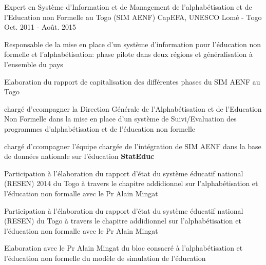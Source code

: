 \begin{cventries}
  \cventry
    {Expert en Système d'Information et de Management de l'alphabétisation et de l'Education non Formelle au Togo (SIM AENF)} %
    {CapEFA, UNESCO} %
    {Lomé - Togo} %
    {Oct. 2011 - Août. 2015} %
    {
      \begin{cvitems} %
        \item {Responsable de la mise en place d'un système d'information pour l'éducation non formelle et l'alphabétisation: phase pilote dans deux régions et généralisation à l'ensemble du pays}
        \item {Elaboration du rapport de capitalisation des différentes phases du SIM AENF au Togo}
        \item {chargé d'ccompagner la Direction Générale de l'Alphabétisation et de l'Education Non Formelle dans la mise en place d'un système de Suivi/Evaluation des programmes d'alphabétisation et de l'éducation non formelle}
        \item {chargé d'ccompagner l'équipe chargée de l'intégration de SIM AENF dans la base de données nationale sur l'éducation {\bf StatEduc}}
        \item {Participation à l'élaboration du rapport d'état du système éducatif national (RESEN) 2014 du Togo à travers le chapitre addidionnel sur l'alphabétisation et l'éducation non formalle avec le Pr Alain Mingat}
        \item {Participation à l'élaboration du rapport d'état du système éducatif national (RESEN) du Togo à travers le chapitre addidionnel sur l'alphabétisation et l'éducation non formalle avec le Pr Alain Mingat}
        \item {Elaboration avec le Pr Alain Mingat du bloc consacré à l'alphabétisation et l'éducation non formelle du modèle de simulation de l'éducation}
      \end{cvitems}
    }


\end{cventries}

